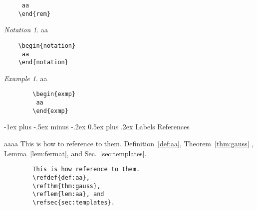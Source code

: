 \documentclass[a4paper,10pt,landscape]{article}
\makeatletter
\theoremstyle{definition}
\theoremstyle{remark}
\newtheorem*{notation}{Notation}
\newtheorem{exmp}{Example}[section] %
\newcommand{\refsec}[1]{Sec.~\ref{#1}}
\newcommand{\refthm}[1]{Theorem~\ref{#1}}
\newcommand{\reflem}[1]{Lemma~\ref{#1}}
\newcommand{\refdef}[1]{Definition~\ref{#1}}
\renewcommand{\section}{\@startsection{section}{1}{0mm}%
                                {-1ex plus -.5ex minus -.2ex}%
                                {0.5ex plus .2ex}%
                                {\normalfont\large\bfseries}}
\makeatother
\begin{document}
\begin{multicols}{3}
\begin{multicols}{2}
\begin{verbatim}
	 aa
	\end{rem}
	\end{verbatim}
\end{multicols}
\begin{multicols}{2}
	\begin{notation}
		aa
	\end{notation}
\columnbreak
	\begin{verbatim}
	\begin{notation}
	 aa
	\end{notation}
	\end{verbatim}
\end{multicols}
\begin{multicols}{2}
	\begin{exmp}
		aa
	\end{exmp}
\columnbreak
	\begin{verbatim}
		\begin{exmp}
		 aa
		\end{exmp}
	\end{verbatim}
\end{multicols}



\section{Labels References}
\begin{multicols}{2}
	aaaa
	This is how to reference to them.
	\refdef{def:aa}, 
	\refthm{thm:gauss}	,
	\reflem{lem:fermat}, and
	\refsec{sec:templates}.
\columnbreak
	\begin{verbatim}
		This is how reference to them.
		\refdef{def:aa}, 
		\refthm{thm:gauss},
		\reflem{lem:aa}, and
		\refsec{sec:templates}.
	\end{verbatim}
\end{multicols}

\end{multicols}
\end{document}
